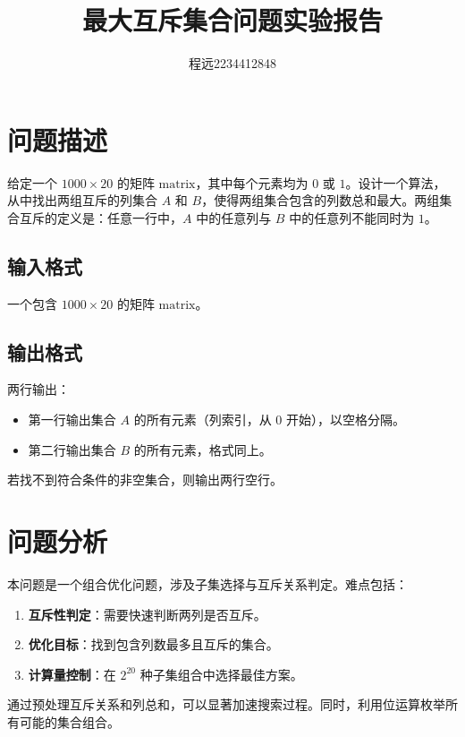 \documentclass[UTF8]{ctexart}
\begin{document}
\title{\vspace{0cm}最大互斥集合问题实验报告}
\author{程远2234412848}
\date{}
\maketitle

\section{问题描述}
给定一个 $1000 \times 20$ 的矩阵 $\text{matrix}$，其中每个元素均为 $0$ 或 $1$。设计一个算法，从中找出两组互斥的列集合 $A$ 和 $B$，使得两组集合包含的列数总和最大。两组集合互斥的定义是：任意一行中，$A$ 中的任意列与 $B$ 中的任意列不能同时为 $1$。

\subsection*{输入格式}
一个包含 $1000 \times 20$ 的矩阵 $\text{matrix}$。

\subsection*{输出格式}
两行输出：
\begin{itemize}
    \item 第一行输出集合 $A$ 的所有元素（列索引，从 $0$ 开始），以空格分隔。
    \item 第二行输出集合 $B$ 的所有元素，格式同上。
\end{itemize}
若找不到符合条件的非空集合，则输出两行空行。

\section{问题分析}
本问题是一个组合优化问题，涉及子集选择与互斥关系判定。难点包括：
\begin{enumerate}
    \item \textbf{互斥性判定}：需要快速判断两列是否互斥。
    \item \textbf{优化目标}：找到包含列数最多且互斥的集合。
    \item \textbf{计算量控制}：在 $2^{20}$ 种子集组合中选择最佳方案。
\end{enumerate}

通过预处理互斥关系和列总和，可以显著加速搜索过程。同时，利用位运算枚举所有可能的集合组合。
\end{document}
